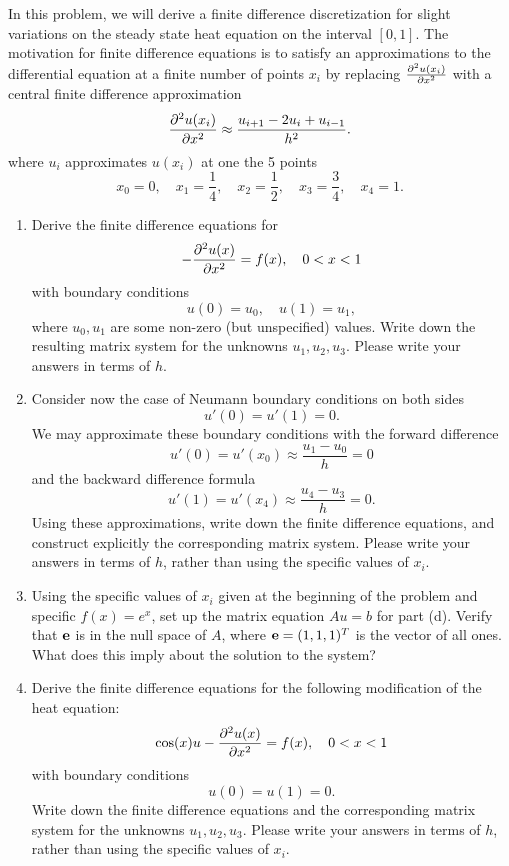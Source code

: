 
In this problem, we will derive a finite difference discretization for slight variations on the steady state heat equation on the interval $[0,1]$.  The motivation for finite difference equations is to satisfy an approximations to the differential equation at a finite number of points $x_i$ by replacing $\frac{\partial^{2} u(x_i)}{\partial x^{2}}$ with a central finite difference approximation
\[
\frac{\partial^{2} u(x_i)}{\partial x^{2}} \approx \frac{ u_{i+1} - 2u_i + u_{i-1}}{h^2}.
\]
where $u_i$ approximates $u(x_i)$ at one the 5 points 
\[
x_0 = 0, \quad x_1 = \frac{1}{4}, \quad x_2 = \frac{1}{2}, \quad x_3 = \frac{3}{4}, \quad x_4 = 1.
\]
\begin{enumerate}
\item Derive the finite difference equations for 
\[
- \frac{\partial^{2} u(x)}{\partial x^{2}} = f(x), \quad 0<x<1
\]
with boundary conditions 
\[
u(0) = u_0, \quad u(1) = u_1,
\]
where $u_0, u_1$ are some non-zero (but unspecified) values.  Write down the resulting matrix system for the unknowns $u_1, u_2, u_3$.  Please write your answers in terms of $h$.
\vspace{1em}
\item Consider now the case of Neumann boundary conditions on both sides
\[
u'(0) = u'(1) = 0.
\]
We may approximate these boundary conditions with the forward difference
\[
u'(0) = u'(x_0) \approx \frac{u_1-u_0}{h} = 0
\]
and the backward difference formula
\[
u'(1) = u'(x_{4}) \approx \frac{u_{4}-u_3}{h} = 0.
\]
Using these approximations, write down the finite difference equations, and construct explicitly the corresponding matrix system.  Please write your answers in terms of $h$, rather than using the specific values of $x_i$.
\item Using the specific values of $x_i$ given at the beginning of the problem and specific $f(x) = e^x$, set up the matrix equation $Au=b$ for part (d).  Verify that ${\bf e}$ is in the null space of ${A}$, where ${\bf e} = (1,1,1)^T$ is the vector of all ones.  What does this imply about the solution to the system?  
\vspace{1em}
\item Derive the finite difference equations for the following modification of the heat equation:
\[
\cos(x) u - \frac{\partial^{2} u(x)}{\partial x^{2}} = f(x), \quad 0<x<1
\]
with boundary conditions 
\[
u(0) = u(1) = 0.
\]
Write down the finite difference equations and the corresponding matrix system for the unknowns $u_1, u_2, u_3$.  Please write your answers in terms of $h$, rather than using the specific values of $x_i$.


\end{enumerate}


